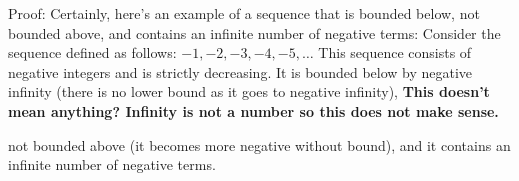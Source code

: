 \documentclass{report}
\begin{document}
Proof: Certainly, here's an example of a sequence that is bounded below, not bounded above, and contains an infinite number of negative terms:
Consider the sequence defined as follows: $-1,-2,-3,-4,-5, \ldots$
This sequence consists of negative integers and is strictly decreasing. It is bounded below by negative infinity (there is no lower bound as it goes to negative infinity), 
\textbf{
  This doesn't mean anything? Infinity is not a number so this does not make sense.
}

not bounded above (it becomes more negative without bound), and it contains an infinite number of negative terms.
\end{document}
